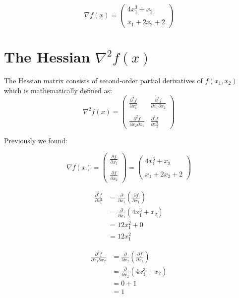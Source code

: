 \documentclass{article}
\begin{document}
\begin{equation}
\nabla f(x) =
\begin{pmatrix}
4x_1^3 + x_2 \\
\\
x_1 + 2x_2 + 2
\end{pmatrix}
\end{equation}

\section*{The Hessian \( \nabla^2 f(x) \)}
The Hessian matrix consists of second-order partial derivatives  of \( f(x_1, x_2) \) which is mathematically defined as: 
\begin{equation}
\nabla^2 f(x) =
\begin{pmatrix}
\frac{\partial^2 f}{\partial x_1^2} & \frac{\partial^2 f}{\partial x_1 \partial x_2} \\
\\
\frac{\partial^2 f}{\partial x_2 \partial x_1} & \frac{\partial^2 f}{\partial x_2^2}
\end{pmatrix}
\end{equation}

Previously we found:

\begin{equation}
\nabla f(x) =
\begin{pmatrix}
\frac{\partial f}{\partial x_1} \\
\\
\frac{\partial f}{\partial x_2}
\end{pmatrix}
=
\begin{pmatrix}
4x_1^3 + x_2 \\
\\
x_1 + 2x_2 + 2
\end{pmatrix}
\end{equation}


\begin{align*}
\frac{\partial^2 f}{\partial x_1^2} &= \frac{\partial}{\partial x_1} \left( \frac{\partial f}{\partial x_1} \right) \\
&= \frac{\partial}{\partial x_1} (4x_1^3 + x_2) \\
&= 12x_1^2 + 0 \\
&= 12x_1^2
\end{align*}


\begin{align*}
\frac{\partial^2 f}{\partial x_1 \partial x_2} &= \frac{\partial}{\partial x_2} \left( \frac{\partial f}{\partial x_1} \right) \\
&= \frac{\partial}{\partial x_2} (4x_1^3 + x_2) \\
&= 0 + 1 \\
&= 1
\end{align*}
\end{document}
